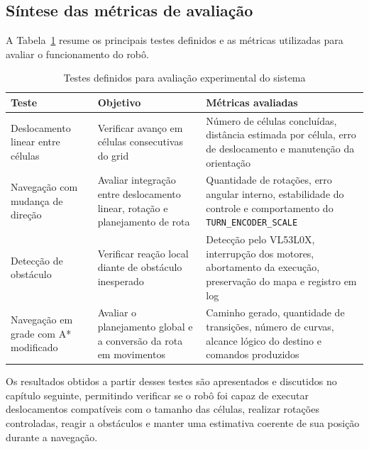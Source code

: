 \documentclass[	12pt, Times, openright, twoside, a4paper, english, brazil]{abntex2}
\begin{document}
\subsection*{Síntese das métricas de avaliação}

A Tabela~\ref{tab:metricas_testes} resume os principais testes definidos e as métricas utilizadas para avaliar o funcionamento do robô.

\begin{table}[ht]
	\centering
	\caption{Testes definidos para avaliação experimental do sistema}
	\label{tab:metricas_testes}
	\begin{tabular}{|p{3.2cm}|p{4.2cm}|p{7.2cm}|}
		\hline
		\textbf{Teste} & \textbf{Objetivo} & \textbf{Métricas avaliadas} \\
		\hline
		Deslocamento linear entre células & Verificar avanço em células consecutivas do grid & Número de células concluídas, distância estimada por célula, erro de deslocamento e manutenção da orientação \\
		\hline
		Navegação com mudança de direção & Avaliar integração entre deslocamento linear, rotação e planejamento de rota & Quantidade de rotações, erro angular interno, estabilidade do controle e comportamento do \texttt{TURN\_ENCODER\_SCALE} \\
		\hline
		Detecção de obstáculo & Verificar reação local diante de obstáculo inesperado & Detecção pelo VL53L0X, interrupção dos motores, abortamento da execução, preservação do mapa e registro em log \\
		\hline
		Navegação em grade com A* modificado & Avaliar o planejamento global e a conversão da rota em movimentos & Caminho gerado, quantidade de transições, número de curvas, alcance lógico do destino e comandos produzidos \\
		\hline
	\end{tabular}
\end{table}

Os resultados obtidos a partir desses testes são apresentados e discutidos no capítulo seguinte, permitindo verificar se o robô foi capaz de executar deslocamentos compatíveis com o tamanho das células, realizar rotações controladas, reagir a obstáculos e manter uma estimativa coerente de sua posição durante a navegação.

\end{document}

